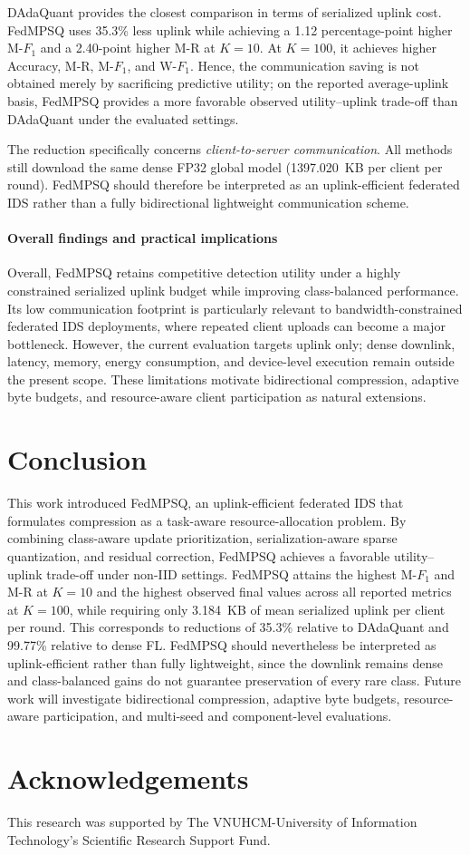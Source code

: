 \documentclass[conference,a4paper]{IEEEtran}
\providecommand{\paperassets}{.}
\begin{document}
DAdaQuant provides the closest comparison in terms of serialized uplink cost.
FedMPSQ uses 35.3\% less uplink while achieving a 1.12 percentage-point higher
M-$F_1$ and a 2.40-point higher M-R at $K=10$. At $K=100$, it
achieves higher Accuracy, M-R, M-$F_1$, and W-$F_1$.
Hence, the communication saving is not obtained merely by sacrificing
predictive utility; on the reported average-uplink basis, FedMPSQ provides a
more favorable observed utility--uplink trade-off than DAdaQuant under the
evaluated settings.

The reduction specifically concerns \emph{client-to-server communication}.
All methods still download the same dense FP32 global model
(1397.020~KB per client per round). FedMPSQ should therefore be interpreted as
an uplink-efficient federated IDS rather than a fully bidirectional lightweight
communication scheme.

\paragraph{Overall findings and practical implications}
Overall, FedMPSQ retains competitive detection utility under a highly
constrained serialized uplink budget while improving class-balanced
performance. Its low communication footprint is particularly relevant to
bandwidth-constrained federated IDS deployments, where repeated client uploads
can become a major bottleneck. However, the current evaluation targets uplink
only; dense downlink, latency, memory, energy consumption, and device-level
execution remain outside the present scope. These limitations motivate
bidirectional compression, adaptive byte budgets, and resource-aware client
participation as natural extensions.

\section{Conclusion}
This work introduced FedMPSQ, an uplink-efficient federated IDS that formulates
compression as a task-aware resource-allocation problem. By combining
class-aware update prioritization, serialization-aware sparse quantization, and
residual correction, FedMPSQ achieves a favorable utility--uplink trade-off
under non-IID settings.
FedMPSQ attains the highest M-$F_1$ and M-R at $K=10$ and the
highest observed final values across all reported metrics at $K=100$, while
requiring only 3.184~KB of mean serialized uplink per client per round. This
corresponds to reductions of 35.3\% relative to DAdaQuant and 99.77\% relative
to dense FL.
FedMPSQ should nevertheless be interpreted as uplink-efficient rather than
fully lightweight, since the downlink remains dense and class-balanced gains do
not guarantee preservation of every rare class. Future work will investigate
bidirectional compression, adaptive byte budgets, resource-aware participation,
and multi-seed and component-level evaluations.

\section*{Acknowledgements} 
This research was supported by The VNUHCM-University of Information Technology's Scientific Research Support Fund.



\end{document}

